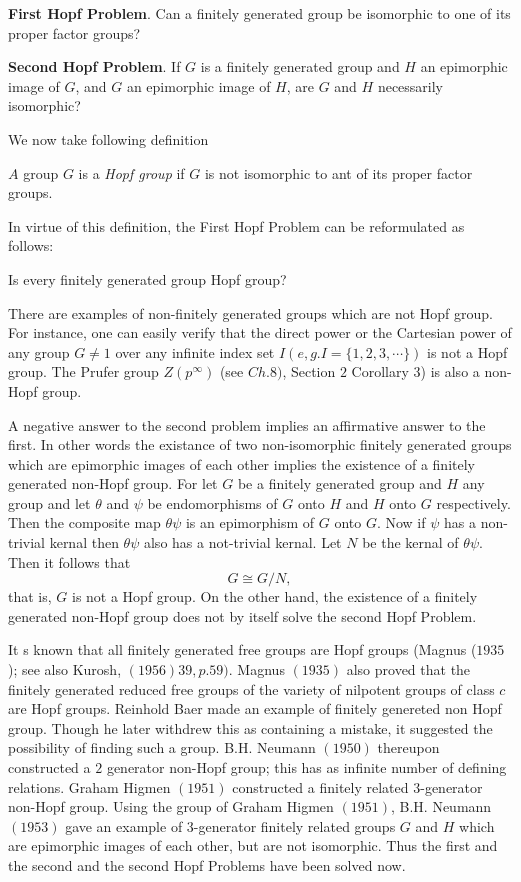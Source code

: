 \textbf{First Hopf Problem}. Can a finitely generated group be
isomorphic to one of its proper factor groups? 

\textbf{Second Hopf Problem}. If $G$ is a finitely generated group and
$H$ an epimorphic image of $G$, and $G$ an epimorphic image of $H$,
are $G$ and $H$ necessarily isomorphic? 

We now take following definition
\begin{definition}
  $A$ group $G$ is a \textit{Hopf group} if $G$ is not isomorphic to
  ant of its proper factor groups. 
\end{definition}

In virtue of this definition, the First Hopf Problem can be
reformulated as follows: 

Is every finitely generated group  Hopf group?

There are examples of non-finitely generated groups which are not Hopf
group. For instance, one can easily verify  that the direct power or
the Cartesian  power of any group $G \neq 1$ over any infinite index
set $I (e,g. I= \{ 1,2,3, \cdots\})$ is not a Hopf group. The Prufer
group $Z (p^{\infty})$ (see $Ch.8)$, Section $2$ Corollary $3$)  is
also a non-Hopf group. 

A negative answer to the second problem implies an affirmative answer
to the first. In other words the existance of two non-isomorphic
finitely generated groups which are epimorphic images of each other
implies  the existence of a finitely generated non-Hopf group. For let
$G$ be a finitely generated group and $H$ any group and let $\theta$
and $\psi$ be endomorphisms of $G$ onto $H$ and $H$ onto $G$
respectively. Then the composite map $\theta \psi$ is an epimorphism
of $G$ onto $G$. Now if $\psi$ has a non-trivial kernal  then $\theta
\psi$ also has a not-trivial kernal. Let $N$ be the kernal of $\theta
\psi$. Then it follows that  
$$
G \cong G/N, 
$$   
that is, $G$ is not a Hopf group. On the other hand, the existence of
a finitely generated non-Hopf group does not by itself solve the
second Hopf Problem. 

It s known that all finitely generated free groups are Hopf groups
(Magnus ($1935$); see also Kurosh,  $(1956) 39, p. 59)$. Magnus
$(1935)$ also proved that the finitely generated reduced free groups
of the variety of nilpotent groups of class $c$ are Hopf
groups. Reinhold Baer made an example of finitely genereted non Hopf
group. Though he later withdrew this as containing a mistake, it
suggested the possibility of finding such a group. B.H. Neumann
$(1950)$ thereupon constructed a $2$ generator non-Hopf group; this
has as infinite number of defining relations. Graham Higmen $(1951)$
constructed a finitely related $3$-generator non-Hopf group. Using the
group of Graham Higmen $(1951)$, B.H. Neumann $(1953)$ gave an example
of $3$-generator finitely related groups $G$ and $H$ which are
epimorphic images of each other, but are not isomorphic. Thus the
first and the second and the second Hopf Problems have been solved
now. 

